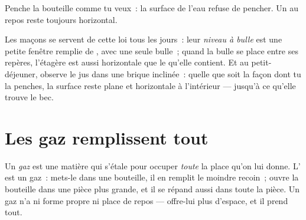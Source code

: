 \begin{omfigure}

{\small Penche la bouteille comme tu veux~: la surface de l'eau
refuse de pencher. Un  au repos reste toujours horizontal.}
\end{omfigure}

\begin{example}\label{ex:g3:solids-liquids-gases:level}
Les maçons se servent de cette loi tous les jours~: leur \emph{niveau
à bulle} est une petite fenêtre remplie de , avec une seule
bulle~; quand la bulle se place entre ses repères, l'étagère est
aussi horizontale que le  qu'elle contient. Et au
petit-déjeuner, observe le jus dans une brique inclinée~: quelle que
soit la façon dont tu la penches, la surface reste plane et
horizontale à l'intérieur --- jusqu'à ce qu'elle trouve le bec.
\end{example}

\section{Les gaz remplissent tout}

\begin{definition}[Gaz]\label{def:g3:solids-liquids-gases:gas}
Un \emph{gaz} est une matière qui s'étale pour occuper
\emph{toute} la place qu'on lui donne. L' est un gaz~: mets-le
dans une bouteille, il en remplit le moindre recoin~; ouvre la
bouteille dans une pièce plus grande, et il se répand aussi dans
toute la pièce. Un gaz n'a ni forme propre ni place de repos ---
offre-lui plus d'espace, et il prend tout.
\end{definition}

